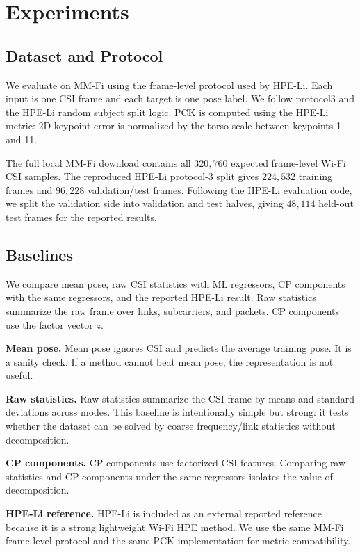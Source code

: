 \documentclass[letterpaper]{article}
\begin{document}
\section{Experiments}

\subsection{Dataset and Protocol}

We evaluate on MM-Fi using the frame-level protocol used by HPE-Li. Each input is one CSI frame and each target is one pose label. We follow protocol3 and the HPE-Li random subject split logic. PCK is computed using the HPE-Li metric: 2D keypoint error is normalized by the torso scale between keypoints 1 and 11.

The full local MM-Fi download contains all $320{,}760$ expected frame-level Wi-Fi CSI samples. The reproduced HPE-Li protocol-3 split gives $224{,}532$ training frames and $96{,}228$ validation/test frames. Following the HPE-Li evaluation code, we split the validation side into validation and test halves, giving $48{,}114$ held-out test frames for the reported results.

\subsection{Baselines}

We compare mean pose, raw CSI statistics with ML regressors, CP components with the same regressors, and the reported HPE-Li result. Raw statistics summarize the raw frame over links, subcarriers, and packets. CP components use the factor vector $z$.

\textbf{Mean pose.}
Mean pose ignores CSI and predicts the average training pose. It is a sanity check. If a method cannot beat mean pose, the representation is not useful.

\textbf{Raw statistics.}
Raw statistics summarize the CSI frame by means and standard deviations across modes. This baseline is intentionally simple but strong: it tests whether the dataset can be solved by coarse frequency/link statistics without decomposition.

\textbf{CP components.}
CP components use factorized CSI features. Comparing raw statistics and CP components under the same regressors isolates the value of decomposition.

\textbf{HPE-Li reference.}
HPE-Li is included as an external reported reference because it is a strong lightweight Wi-Fi HPE method. We use the same MM-Fi frame-level protocol and the same PCK implementation for metric compatibility.
\end{document}
